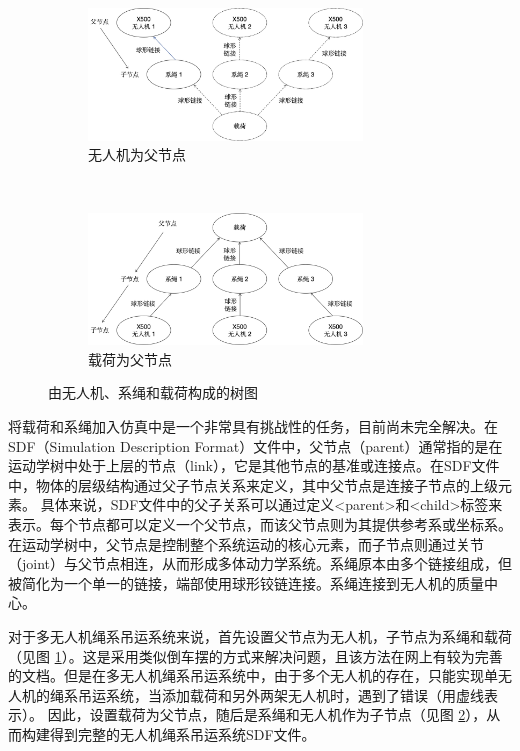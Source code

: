 \documentclass[lang=chs, degree=master, blindreview=false, winfonts=true]{yanputhesis}
\begin{document}
\begin{figure}[hbt!]
	\centering
	\begin{subfigure}[t]{0.9\textwidth}
		\centering
		\includegraphics[width=0.8\textwidth]{picture/tree2.png}
		\caption{无人机为父节点}
		\label{tree1}
	\end{subfigure}\\[2ex] %
	\begin{subfigure}[t]{0.9\textwidth}
		\centering
		\includegraphics[width=0.8\textwidth]{picture/tree1.png}
		\caption{载荷为父节点}
		\label{tree2}
	\end{subfigure}
	\caption{由无人机、系绳和载荷构成的树图}
	\label{tree_combined}
\end{figure}

将载荷和系绳加入仿真中是一个非常具有挑战性的任务，目前尚未完全解决。在SDF（Simulation Description Format）文件中，父节点（parent）通常指的是在运动学树中处于上层的节点（link），它是其他节点的基准或连接点。在SDF文件中，物体的层级结构通过父子节点关系来定义，其中父节点是连接子节点的上级元素。
具体来说，SDF文件中的父子关系可以通过定义<parent>和<child>标签来表示。每个节点都可以定义一个父节点，而该父节点则为其提供参考系或坐标系。在运动学树中，父节点是控制整个系统运动的核心元素，而子节点则通过关节（joint）与父节点相连，从而形成多体动力学系统。系绳原本由多个链接组成，但被简化为一个单一的链接，端部使用球形铰链连接。系绳连接到无人机的质量中心。

对于多无人机绳系吊运系统来说，首先设置父节点为无人机，子节点为系绳和载荷（见图 \ref{tree1}）。这是采用类似倒车摆的方式来解决问题，且该方法在网上有较为完善的文档。但是在多无人机绳系吊运系统中，由于多个无人机的存在，只能实现单无人机的绳系吊运系统，当添加载荷和另外两架无人机时，遇到了错误（用虚线表示）。
因此，设置载荷为父节点，随后是系绳和无人机作为子节点（见图 \ref{tree2}），从而构建得到完整的无人机绳系吊运系统SDF文件。
\end{document}
